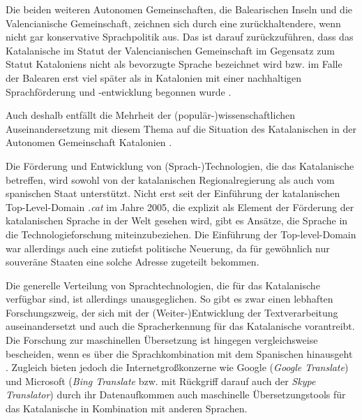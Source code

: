 Die beiden weiteren Autonomen Gemeinschaften, die Balearischen Inseln und die Valencianische Gemeinschaft, zeichnen sich durch eine zurückhaltendere, wenn nicht gar konservative Sprachpolitik aus. Das ist darauf zurückzuführen, dass das Katalanische im Statut der Valencianischen Gemeinschaft im Gegensatz zum Statut Kataloniens nicht als bevorzugte Sprache bezeichnet wird bzw. im Falle der Balearen erst viel später als in Katalonien mit einer nachhaltigen Sprachförderung und -entwicklung begonnen wurde \citep[527\psq]{casesnoves_primary_2019}.

Auch deshalb entfällt die Mehrheit der (populär-)wissenschaftlichen Auseinandersetzung mit diesem Thema auf die Situation des Katalanischen in der Autonomen Gemeinschaft Katalonien \citep[]{casesnoves_primary_2019, moreno_llengua_2012, berche_politica_2014}.

Die Förderung und Entwicklung von (Sprach-)Technologien, die das Katalanische betreffen, wird sowohl von der katalanischen Regionalregierung als auch vom spanischen Staat unterstützt. Nicht erst seit der Einführung der katalanischen Top-Level-Domain \emph{.cat} im Jahre 2005, die explizit als Element der Förderung der katalanischen Sprache in der Welt gesehen wird, gibt es Ansätze, die Sprache in die Technologieforschung miteinzubeziehen. Die Einführung der Top-level-Domain war allerdings auch eine zutiefst politische Neuerung, da für gewöhnlich nur souveräne Staaten eine solche Adresse zugeteilt bekommen.

Die generelle Verteilung von Sprachtechnologien, die für das Katalanische verfügbar sind, ist allerdings unausgeglichen. So gibt es zwar einen lebhaften Forschungszweig, der sich mit der (Weiter-)Entwicklung der Textverarbeitung auseinandersetzt und auch die Spracherkennung für das Katalanische vorantreibt. Die Forschung zur maschinellen Übersetzung ist hingegen vergleichsweise bescheiden, wenn es über die Sprachkombination mit dem Spanischen hinausgeht \citep[22]{moreno_llengua_2012}. Zugleich bieten jedoch die Internetgroßkonzerne wie Google (\emph{Google Translate}) und Microsoft (\emph{Bing Translate} bzw. mit Rückgriff darauf auch der \emph{Skype Translator}) durch ihr Datenaufkommen auch maschinelle Übersetzungstools für das Katalanische in Kombination mit anderen Sprachen.

